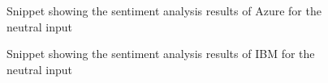 \begin{enumerate}
\begin {figure}[h!h]
            \caption{Snippet showing the sentiment analysis results of Azure for the neutral input}
            \label{azsaneut}
        \end {figure}
        \begin {figure}[h!h]
            \centering
            \caption{Snippet showing the sentiment analysis results of IBM for the neutral input}
            \label{ibmsaneut}
        \end {figure}
    \clearpage 
\end{enumerate}

